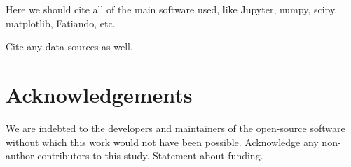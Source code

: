 Here we should cite all of the main software used, like Jupyter, numpy, scipy,
matplotlib, Fatiando, etc.

Cite any data sources as well.

\section{Acknowledgements}

We are indebted to the developers and maintainers of the open-source software
without which this work would not have been possible.
Acknowledge any non-author contributors to this study.
Statement about funding.


